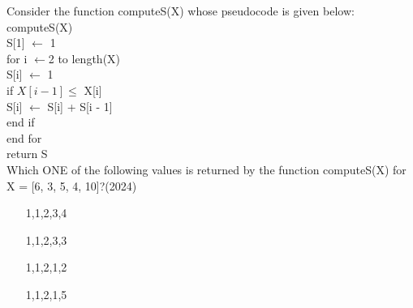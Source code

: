     \item  Consider the function computeS(X) whose pseudocode is given below:
    computeS(X)\\
    S[1] $\leftarrow$ 1\\
    for i $\leftarrow$2 to length(X)\\
     S[i] $\leftarrow$ 1\\
     if $X[i - 1] \leq$ X[i]\\
     S[i] $\leftarrow$ S[i] + S[i - 1]\\
     end if\\
    end for\\
    return S\\
    Which ONE of the following values is returned by the function computeS(X)
    for X = [6, 3, 5, 4, 10]?\hfill (2024)
    \begin{enumerate}[label = (\Alph*) ]
        \item [1,1,2,3,4]
        \item [1,1,2,3,3]
        \item [1,1,2,1,2]
        \item [1,1,2,1,5]
    \end{enumerate}


